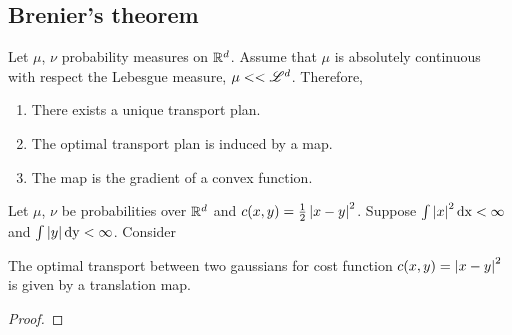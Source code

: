 \subsection{Brenier's theorem}

\begin{theorem}
	Let $\mu$, $\nu$ probability measures on $\mathbb{R}^d$. Assume that $\mu$ is absolutely continuous with respect the Lebesgue measure, $\mu<<\mathscr{L}^d$. Therefore,
	\begin{enumerate}
		\item There exists a unique transport plan.
		\item The optimal transport plan is induced by a map.
		\item The map is the gradient of a convex function. 
	\end{enumerate}
\end{theorem}

\begin{theorem}
	Let $\mu$, $\nu$  be probabilities over $\mathbb{R}^d$ and $c(x,y)=\frac{1}{2}\left| x-y \right|^2$. Suppose $\int \left| x \right|^2 \mathrm{dx} <\infty$ and $\int \left| y \right|\mathrm{dy}<\infty$. Consider
\end{theorem}


\begin{theorem}
	The optimal transport between two gaussians for cost function $c(x,y)=\left| x-y \right|^2$ is given by a translation map.
\end{theorem}

\begin{proof}
	
\end{proof}


